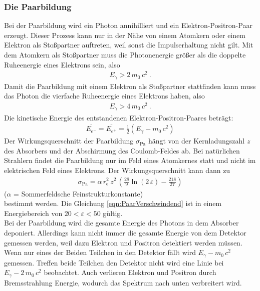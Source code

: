 \subsubsection{Die Paarbildung}
Bei der Paarbildung wird ein Photon annihilliert und ein Elektron-Positron-Paar erzeugt. Dieser Prozess kann nur in der Nähe von einem Atomkern oder einem Elektron als Stoßpartner auftreten, weil sonst die Impulserhaltung nicht gilt. Mit dem Atomkern als Stoßpartner muss die Photonenergie größer als die doppelte Ruheenergie eines Elektrons sein, also
\begin{align*}
	E_{\gamma} > 2\,m_0\,c^2 \ .
\end{align*}
Damit die Paarbildung mit einem Elektron als Stoßpartner stattfinden kann muss das Photon die vierfache Ruheenergie eines Elektrons haben, also
\begin{align*}
	E_{\gamma} > 4\,m_0\,c^2 \ .
\end{align*}
Die kinetische Energie des entstandenen Elektron-Positron-Paares beträgt:
\begin{align}
	\overline{E_{\text{e}^-}} = \overline{E_{\text{e}^+}} = \frac{1}{2}(E_{\gamma} - m_0\,c^2)
\end{align}
Der Wirkungsquerschnitt der Paarbildung $\sigma_\text{Pa}$ hängt von der Kernladungszahl $z$ des Absorbers und der Abschirmung des Coulomb-Feldes ab. Bei natürlichen Strahlern findet die Paarbildung nur im Feld eines Atomkernes statt und nicht im elektrischen Feld eines Elektrons. Der Wirkungsquerschnitt kann dann zu
\begin{align}
	\sigma_\text{Pa} = \alpha\, r_\text{e}^2\, z^2\, \left(\frac{28}{9}\ln(2\,\varepsilon) - \frac{218}{27} \right)
	\label{eqn:PaarVerschwindend}
\end{align}
\hfil {\footnotesize($\alpha$ = Sommerfeldsche Feinstrukturkonstante)} \hfil \\
bestimmt werden. Die Gleichung \eqref{eqn:PaarVerschwindend} ist in einem Energiebereich von $20 < \varepsilon < 50$ gültig.  \\
Bei der Paarbildung wird die gesamte Energie des Photons in dem Absorber deponiert. Allerdings kann nicht immer die gesamte Energie von dem Detektor gemessen werden, weil dazu Elektron und Positron detektiert werden müssen. Wenn nur eines der Beiden Teilchen in den Detektor fällt wird $E_\gamma - m_0\,c^2$ gemessen. Treffen beide Teilchen den Detektor nicht wird eine Linie bei $E_\gamma - 2\,m_0\,c^2$ beobachtet. Auch verlieren Elektron und Positron durch Bremsstrahlung Energie, wodurch das Spektrum nach unten verbreitert wird. 



